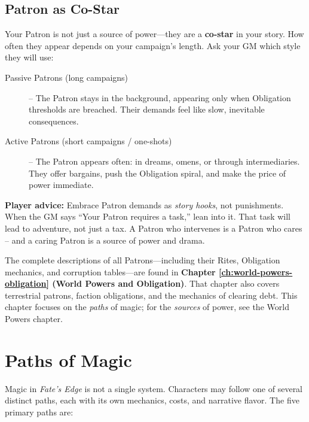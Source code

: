 \subsection{Patron as Co-Star}
\label{sec:patron-co-star}

Your Patron is not just a source of power---they are a \textbf{co-star} in your story. How often they appear depends on your campaign's length. Ask your GM which style they will use:

\begin{description}
  \item[Passive Patrons (long campaigns)] -- The Patron stays in the background, appearing only when Obligation thresholds are breached. Their demands feel like slow, inevitable consequences.
  \item[Active Patrons (short campaigns / one-shots)] -- The Patron appears often: in dreams, omens, or through intermediaries. They offer bargains, push the Obligation spiral, and make the price of power immediate.
\end{description}

\noindent\textbf{Player advice:} Embrace Patron demands as \emph{story hooks}, not punishments. When the GM says ``Your Patron requires a task,'' lean into it. That task will lead to adventure, not just a tax. A Patron who intervenes is a Patron who cares -- and a caring Patron is a source of power and drama.

\begin{tcolorbox}[colback=gray!5!white, colframe=gray!60!white, title=For Full Patron Details,breakable]
The complete descriptions of all Patrons---including their Rites, Obligation mechanics, and corruption tables---are found in \textbf{Chapter \ref{ch:world-powers-obligation} (World Powers and Obligation)}. That chapter also covers terrestrial patrons, faction obligations, and the mechanics of clearing debt. This chapter focuses on the \emph{paths} of magic; for the \emph{sources} of power, see the World Powers chapter.
\end{tcolorbox}

\section{Paths of Magic}
\label{sec:paths-of-magic}

Magic in \textit{Fate's Edge} is not a single system. Characters may follow one of several distinct paths, each with its own mechanics, costs, and narrative flavor. The five primary paths are:


